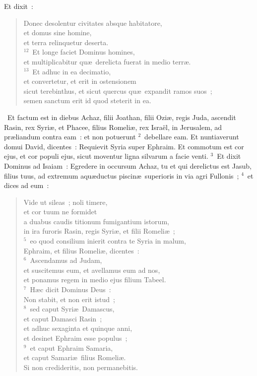  Et dixit~: \begin{flushleft}\begin{verse}Donec desolentur civitates absque habitatore,\\ et domus sine homine,\\ et terra relinquetur deserta.\\
${}^{12}$~Et longe faciet Dominus homines,\\ et multiplicabitur qu\ae\ derelicta fuerat in medio terr\ae .\\
${}^{13}$~Et adhuc in ea decimatio,\\ et convertetur, et erit in ostensionem\\ sicut terebinthus, et sicut quercus qu\ae\ expandit ramos suos~;\\ semen sanctum erit id quod steterit in ea.\end{verse}\end{flushleft}


~\lettrine[lines=10,image=true,loversize=0.05,lraise=-0.03]{E}{}t factum est in diebus Achaz, filii Joathan, filii Ozi\ae , regis Juda, ascendit Rasin, rex Syri\ae , et Phacee, filius Romeli\ae , rex Isra\"el, in Jerusalem, ad pr\ae liandum contra eam~: et non potuerunt
${}^{2}$~debellare eam. Et nuntiaverunt domui David, dicentes~: Requievit Syria super Ephraim. Et commotum est cor ejus, et cor populi ejus, sicut moventur ligna silvarum a facie venti.
${}^{3}$~Et dixit Dominus ad Isaiam~: Egredere in occursum Achaz, tu et qui derelictus est Jasub, filius tuus, ad extremum aqu\ae ductus piscin\ae\ superioris in via agri Fullonis~;
${}^{4}$~et dices ad eum~: \begin{flushleft}\begin{verse}Vide ut sileas~; noli timere,\\ et cor tuum ne formidet\\ a duabus caudis titionum fumigantium istorum,\\ in ira furoris Rasin, regis Syri\ae , et filii Romeli\ae~;\\
${}^{5}$~eo quod consilium inierit contra te Syria in malum,\\ Ephraim, et filius Romeli\ae , dicentes~:\\
${}^{6}$~Ascendamus ad Judam,\\ et suscitemus eum, et avellamus eum ad nos,\\ et ponamus regem in medio ejus filium Tabeel.\\
${}^{7}$~H\ae c dicit Dominus Deus~:\\ Non stabit, et non erit istud~;\\
${}^{8}$~sed caput Syri\ae\ Damascus,\\ et caput Damasci Rasin~;\\ et adhuc sexaginta et quinque anni,\\ et desinet Ephraim esse populus~;\\
${}^{9}$~et caput Ephraim Samaria,\\ et caput Samari\ae\ filius Romeli\ae .\\ Si non credideritis, non permanebitis.\end{verse}\end{flushleft}


